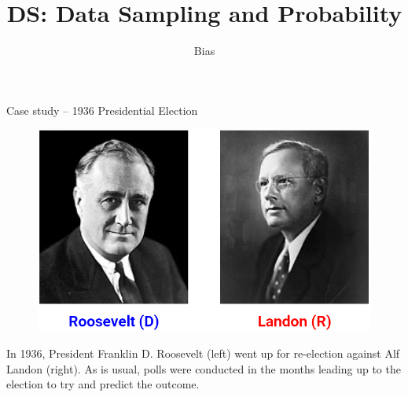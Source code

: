 \documentclass[aspectratio=169]{../latex_main/tntbeamer}  %
\title[Introduction]{DS: Data Sampling and Probability}
\subtitle{Bias}
\begin{document}
	
	\maketitle
	\begin{frame}{Case study – 1936 Presidential Election}
	  \begin{figure}
	      \centering
	      \includegraphics[scale=.4]{Bild11}
	  \end{figure}
	  In 1936, President Franklin D. Roosevelt (left) went up for re-election against Alf Landon (right). As is usual, polls were conducted in the months leading up to the election to try and predict the outcome.

	\end{frame}
	
\end{document}
